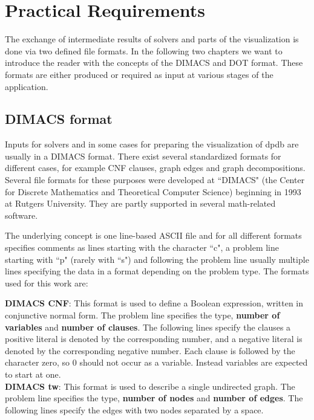 \documentclass[a4paper, 12pt, bibliography=totoc]{scrartcl}
\begin{document}
\section{Practical Requirements}\label{sec:practicalreq}
The exchange of intermediate results of solvers and parts of the visualization is done via two defined file formats. In the following two chapters we want to introduce the reader with the concepts of the DIMACS and DOT format. These formats are either produced or required as input at various stages of the application.
  
\subsection{DIMACS format}

Inputs for solvers and in some cases for preparing the visualization of dpdb are usually in a DIMACS format. There exist several standardized formats for different cases, for example CNF clauses, graph edges and graph decompositions.
Several file formats for these purposes were developed at ``DIMACS" (the Center for Discrete Mathematics and Theoretical Computer Science) \cite{dimacsimplcha} beginning in 1993 at Rutgers University.
They are partly supported in several math-related software.

The underlying concept is one line-based ASCII file and for all different formats specifies comments as lines starting with the character ``c", a problem line starting with ``p" (rarely with ``s") and following the problem line usually multiple lines specifying the data in a format depending on the problem type.
The formats used for this work are:

\textbf{DIMACS CNF}: This format is used to define a Boolean expression, written in conjunctive normal form. The problem line specifies the type, \textbf{number of variables} and \textbf{number of clauses}. The following lines specify the clauses a positive literal is denoted by the corresponding number, and a negative literal is denoted by the corresponding negative number. Each clause is followed by the character zero, so 0 should not occur as a variable. Instead variables are expected to start at one.\\

\textbf{DIMACS tw}: This format is used to describe a single undirected graph. The problem line specifies the type, \textbf{number of nodes} and \textbf{number of edges}. The following lines specify the edges with two nodes separated by a space.\\
\end{document}
